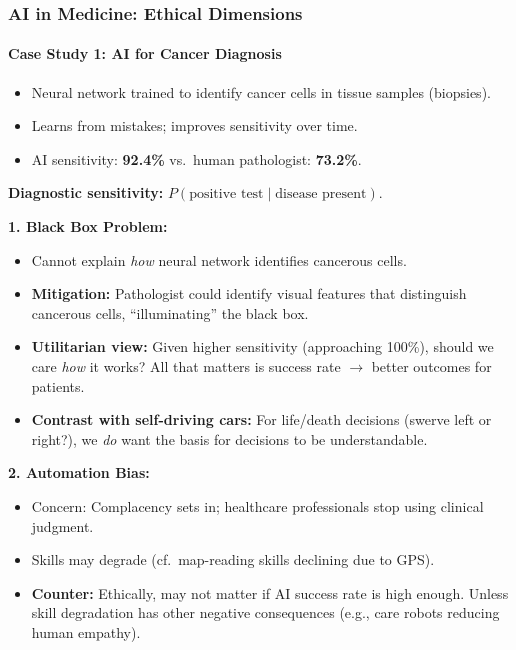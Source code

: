 \bigseparator

\subsubsection{AI in Medicine: Ethical Dimensions}

\paragraph*{Case Study 1: AI for Cancer Diagnosis}

\begin{keybox}[Scenario]
\begin{itemize}
  \item Neural network trained to identify cancer cells in tissue samples (biopsies).
  \item Learns from mistakes; improves sensitivity over time.
  \item AI sensitivity: \textbf{92.4\%} vs.\ human pathologist: \textbf{73.2\%}.
\end{itemize}

\textbf{Diagnostic sensitivity:} $P(\text{positive test} \mid \text{disease present})$.
\end{keybox}

\begin{exbox}
\textbf{1. Black Box Problem:}
\begin{itemize}
  \item Cannot explain \textit{how} neural network identifies cancerous cells.
  \item \textbf{Mitigation:} Pathologist could identify visual features that distinguish cancerous cells, ``illuminating'' the black box.
  \item \textbf{Utilitarian view:} Given higher sensitivity (approaching 100\%), should we care \textit{how} it works? All that matters is success rate $\to$ better outcomes for patients.
  \item \textbf{Contrast with self-driving cars:} For life/death decisions (swerve left or right?), we \textit{do} want the basis for decisions to be understandable.
\end{itemize}

\textbf{2. Automation Bias:}
\begin{itemize}
  \item Concern: Complacency sets in; healthcare professionals stop using clinical judgment.
  \item Skills may degrade (cf.\ map-reading skills declining due to GPS).
  \item \textbf{Counter:} Ethically, may not matter if AI success rate is high enough. Unless skill degradation has other negative consequences (e.g., care robots reducing human empathy).
\end{itemize}
\end{exbox}

